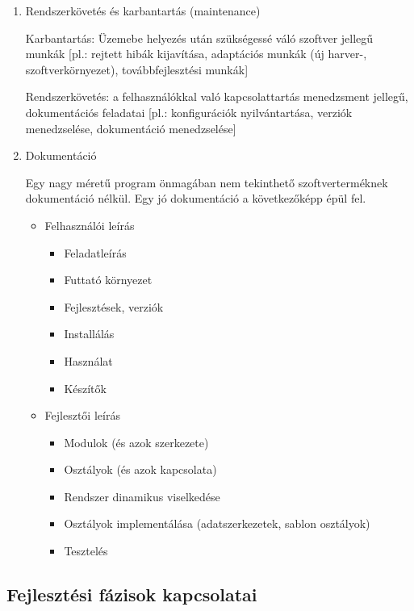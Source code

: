 \documentclass[margin=0px]{article}
\begin{document}
\begin{enumerate}
			\item Rendszerkövetés és karbantartás (maintenance)
			
			Karbantartás: Üzemebe helyezés után szükségessé váló szoftver jellegű munkák [pl.: rejtett hibák kijavítása, adaptációs munkák (új harver-, szoftverkörnyezet), továbbfejlesztési munkák]
			
			Rendszerkövetés: a felhasználókkal való kapcsolattartás menedzsment jellegű, dokumentációs feladatai [pl.: konfigurációk nyilvántartása, verziók menedzselése, dokumentáció menedzselése]
			
			\item Dokumentáció
			
			Egy nagy méretű program önmagában nem tekinthető szoftverterméknek
			dokumentáció nélkül. Egy jó dokumentáció a következőképp épül fel.
			\begin{itemize}
				\item Felhasználói leírás
					\begin{itemize}
						\item Feladatleírás
						\item Futtató környezet
						\item Fejlesztések, verziók
						\item Installálás
						\item Használat
						\item Készítők
					\end{itemize}
				\item Fejlesztői leírás
					\begin{itemize}
						\item Modulok (és azok szerkezete)
						\item Osztályok (és azok kapcsolata)
						\item Rendszer dinamikus viselkedése
						\item Osztályok implementálása (adatszerkezetek, sablon osztályok)
						\item Tesztelés
					\end{itemize}
			\end{itemize}	
		\end{enumerate}
		
		\subsection{Fejlesztési fázisok kapcsolatai}
		
\end{document}
